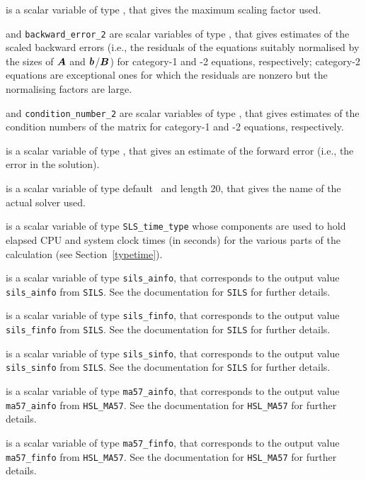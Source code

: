 \documentclass{galahad}
\newcommand{\packagename}{SLS}
\begin{document}
\begin{description}
 is a scalar variable of type \realdp,
that gives the maximum scaling factor used.

 and
{\tt backward\_error\_2} are scalar variables of type \realdp,
that gives estimates of the scaled backward errors (i.e., the residuals
of the equations suitably normalised by the sizes of ${\bm{A}}$ and 
${\bm{b}}$/${\bm{B}}$) for category-1 and -2 equations, respectively;
category-2 equations are exceptional ones for which the residuals are 
nonzero but the normalising factors are large.

 and
{\tt condition\_number\_2} are scalar variables of type \realdp,
that gives estimates of the condition numbers of the matrix
for category-1 and -2 equations, respectively.

 is a scalar variable of type \realdp,
that gives an estimate of the forward error (i.e., the error in the solution).

 is a scalar variable of type default \character\
and length 20, that  gives the name of the actual solver used.

 is a scalar variable of type {\tt \packagename\_time\_type}
whose components are used to hold elapsed CPU and system clock times
(in seconds) for the various parts of the calculation
(see Section~\ref{typetime}).

 is a scalar variable of type {\tt sils\_ainfo},
that corresponds to the output value {\tt sils\_ainfo}
from {\tt SILS}. See the documentation for {\tt SILS} for further
details.

 is a scalar variable of type {\tt sils\_finfo},
that corresponds to the output value {\tt sils\_finfo}
from {\tt SILS}. See the documentation for {\tt SILS} for further
details.

 is a scalar variable of type {\tt sils\_sinfo},
that corresponds to the output value {\tt sils\_sinfo}
from {\tt SILS}. See the documentation for {\tt SILS} for further
details.

 is a scalar variable of type {\tt ma57\_ainfo},
that corresponds to the output value {\tt ma57\_ainfo}
from {\tt HSL\_MA57}. See the documentation for {\tt HSL\_MA57} for further
details.

 is a scalar variable of type {\tt ma57\_finfo},
that corresponds to the output value {\tt ma57\_finfo}
from {\tt HSL\_MA57}. See the documentation for {\tt HSL\_MA57} for further
details.


\end{description}
\end{document}
